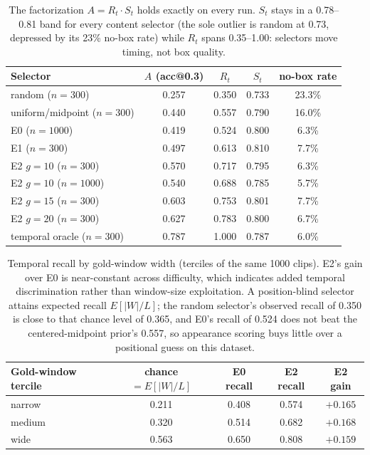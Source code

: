 \begin{table}[htbp]
\centering
\small
\begin{tabular}{lcccc}
\toprule
Selector & $A$ (acc@0.3) & $R_t$ & $S_t$ & no-box rate \\
\midrule
random ($n=300$) & 0.257 & 0.350 & 0.733 & 23.3\% \\
uniform/midpoint ($n=300$) & 0.440 & 0.557 & 0.790 & 16.0\% \\
E0 ($n=1000$) & 0.419 & 0.524 & 0.800 & 6.3\% \\
E1 ($n=300$) & 0.497 & 0.613 & 0.810 & 7.7\% \\
E2 $g=10$ ($n=300$) & 0.570 & 0.717 & 0.795 & 6.3\% \\
E2 $g=10$ ($n=1000$) & 0.540 & 0.688 & 0.785 & 5.7\% \\
E2 $g=15$ ($n=300$) & 0.603 & 0.753 & 0.801 & 7.7\% \\
E2 $g=20$ ($n=300$) & 0.627 & 0.783 & 0.800 & 6.7\% \\
temporal oracle ($n=300$) & 0.787 & 1.000 & 0.787 & 6.0\% \\
\bottomrule
\end{tabular}
\caption{The factorization $A = R_t \cdot S_t$ holds exactly on every run. $S_t$ stays in a 0.78--0.81 band for every content selector (the sole outlier is random at 0.73, depressed by its 23\% no-box rate) while $R_t$ spans 0.35--1.00: selectors move timing, not box quality.}
\label{tab:factor}
\end{table}

\begin{table}[htbp]
\centering
\small
\begin{tabular}{lcccc}
\toprule
Gold-window tercile & chance $=E[|W|/L]$ & E0 recall & E2 recall & E2 gain \\
\midrule
narrow & 0.211 & 0.408 & 0.574 & $+0.165$ \\
medium & 0.320 & 0.514 & 0.682 & $+0.168$ \\
wide & 0.563 & 0.650 & 0.808 & $+0.159$ \\
\bottomrule
\end{tabular}
\caption{Temporal recall by gold-window width (terciles of the same 1000 clips). E2's gain over E0 is near-constant across difficulty, which indicates added temporal discrimination rather than window-size exploitation. A position-blind selector attains expected recall $E[|W|/L]$; the random selector's observed recall of 0.350 is close to that chance level of 0.365, and E0's recall of 0.524 does not beat the centered-midpoint prior's 0.557, so appearance scoring buys little over a positional guess on this dataset.}
\label{tab:tercile}
\end{table}

